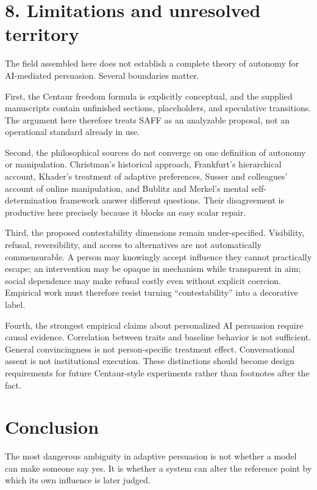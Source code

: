 \documentclass[
  10pt,
]{article}
\begin{document}
\section{8. Limitations and unresolved
territory}\label{limitations-and-unresolved-territory}

The field assembled here does not establish a complete theory of
autonomy for AI-mediated persuasion. Several boundaries matter.

First, the Centaur freedom formula is explicitly conceptual, and the
supplied manuscripts contain unfinished sections, placeholders, and
speculative transitions. The argument here therefore treats SAFF as an
analyzable proposal, not an operational standard already in use.

Second, the philosophical sources do not converge on one definition of
autonomy or manipulation. Christman's historical approach, Frankfurt's
hierarchical account, Khader's treatment of adaptive preferences, Susser
and colleagues' account of online manipulation, and Bublitz and Merkel's
mental self-determination framework answer different questions. Their
disagreement is productive here precisely because it blocks an easy
scalar repair.

Third, the proposed contestability dimensions remain under-specified.
Visibility, refusal, reversibility, and access to alternatives are not
automatically commensurable. A person may knowingly accept influence
they cannot practically escape; an intervention may be opaque in
mechanism while transparent in aim; social dependence may make refusal
costly even without explicit coercion. Empirical work must therefore
resist turning ``contestability'' into a decorative label.

Fourth, the strongest empirical claims about personalized AI persuasion
require causal evidence. Correlation between traits and baseline
behavior is not sufficient. General convincingness is not
person-specific treatment effect. Conversational assent is not
institutional execution. These distinctions should become design
requirements for future Centaur-style experiments rather than footnotes
after the fact.

\section{Conclusion}\label{conclusion}

The most dangerous ambiguity in adaptive persuasion is not whether a
model can make someone say yes. It is whether a system can alter the
reference point by which its own influence is later judged.
\end{document}
